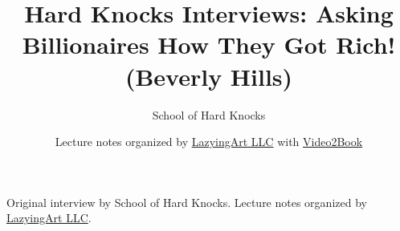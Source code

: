 \documentclass[11pt,oneside]{book}
\begin{document}
\frontmatter
\title{Hard Knocks Interviews: Asking Billionaires How They Got Rich! (Beverly Hills)}
\author{School of Hard Knocks}
\date{Lecture notes organized by \href{https://lazying.art}{LazyingArt LLC} with \href{https://github.com/lachlanchen/Video2Book}{Video2Book}}
\maketitle
\begin{center}
\small Original interview by School of Hard Knocks. Lecture notes organized by \href{https://lazying.art}{LazyingArt LLC}.
\end{center}
\clearpage
\mainmatter

\end{document}
